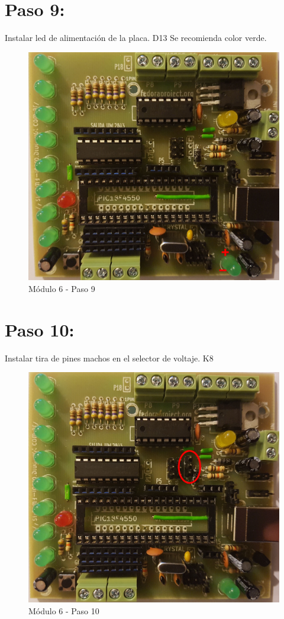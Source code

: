 \newpage

\section{Paso 9:}

Instalar led de alimentación de la placa. D13 Se recomienda color verde.

\begin{figure}[h]
	\centering
	\includegraphics[width=0.8\linewidth]{Modulo_6/M6_9}
	\caption{Módulo 6 - Paso 9}
	\label{fig:M6_9}
\end{figure}

\newpage

\section{Paso 10:}

Instalar tira de pines machos en el selector de voltaje. K8

\begin{figure}[h]
	\centering
	\includegraphics[width=0.8\linewidth]{Modulo_6/M6_10}
	\caption{Módulo 6 - Paso 10}
	\label{fig:M6_10}
\end{figure}

